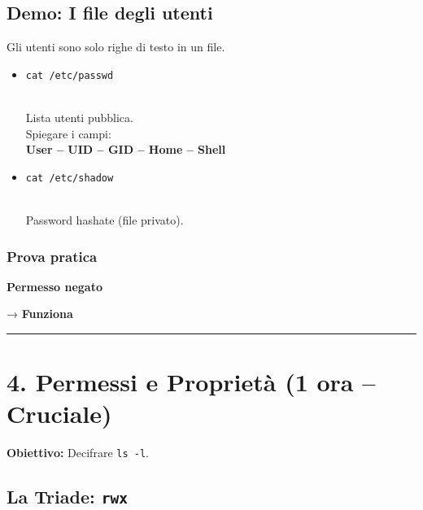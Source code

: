 \documentclass[11pt,a4paper]{article}
\begin{document}
\subsection{Demo: I file degli utenti}\label{demo-i-file-degli-utenti}

Gli utenti sono solo righe di testo in un file.

\begin{itemize}
\item
  \texttt{cat\ /etc/passwd}\strut \\
  Lista utenti pubblica.\\
  Spiegare i campi:\\
  \textbf{User -- UID -- GID -- Home -- Shell}
\item
  \texttt{cat\ /etc/shadow}\strut \\
  Password hashate (file privato).
\end{itemize}

\subsubsection{Prova pratica}\label{prova-pratica}

\begin{Shaded}
\begin{Highlighting}[]
\end{Highlighting}
\end{Shaded}

\textbf{Permesso negato}

\begin{Shaded}
\begin{Highlighting}[]
\end{Highlighting}
\end{Shaded}

→ \textbf{Funziona}

\begin{center}\rule{0.5\linewidth}{0.5pt}\end{center}

\section{4. Permessi e Proprietà (1 ora --
Cruciale)}\label{permessi-e-proprietuxe0-1-ora-cruciale}

\textbf{Obiettivo:} Decifrare \texttt{ls\ -l}.

\subsection{\texorpdfstring{La Triade:
\texttt{rwx}}{La Triade: rwx}}\label{la-triade-rwx}
\end{document}
